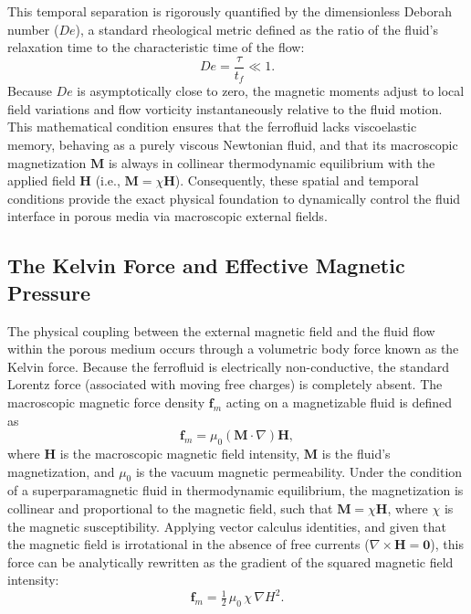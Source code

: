 This temporal separation is rigorously quantified by the dimensionless Deborah number ($De$), a standard rheological metric defined as the ratio of the fluid's relaxation time to the characteristic time of the flow:
\begin{equation}
    De = \frac{\tau}{t_f} \ll 1.
\end{equation}
Because $De$ is asymptotically close to zero, the magnetic moments adjust to local field variations and flow vorticity instantaneously relative to the fluid motion.
This mathematical condition ensures that the ferrofluid lacks viscoelastic memory, behaving as a purely viscous Newtonian fluid, and that its macroscopic magnetization $\mathbf{M}$ is always in collinear thermodynamic equilibrium with the applied field $\mathbf{H}$ (i.e., $\mathbf{M} = \chi \mathbf{H}$).
Consequently, these spatial and temporal conditions provide the exact physical foundation to dynamically control the fluid interface in porous media via macroscopic external fields.

\subsection{The Kelvin Force and Effective Magnetic Pressure}

The physical coupling between the external magnetic field and the fluid flow within the porous medium occurs through a volumetric body force known as the Kelvin force.
Because the ferrofluid is electrically non-conductive, the standard Lorentz force (associated with moving free charges) is completely absent.
The macroscopic magnetic force density $\mathbf{f}_m$ acting on a magnetizable fluid is defined as
\begin{equation}
    \mathbf{f}_m = \mu_0 (\mathbf{M} \cdot \nabla)\mathbf{H},
\end{equation}
where $\mathbf{H}$ is the macroscopic magnetic field intensity, $\mathbf{M}$ is the fluid's magnetization, and $\mu_0$ is the vacuum magnetic permeability.
Under the condition of a superparamagnetic fluid in thermodynamic equilibrium, the magnetization is collinear and proportional to the magnetic field, such that $\mathbf{M} = \chi \mathbf{H}$, where $\chi$ is the magnetic susceptibility.
Applying vector calculus identities, and given that the magnetic field is irrotational in the absence of free currents ($\nabla \times \mathbf{H} = \mathbf{0}$), this force can be analytically rewritten as the gradient of the squared magnetic field intensity:
\begin{equation}
\label{eq:kelvin-uniform-chi}
    \mathbf{f}_m = \tfrac{1}{2}\, \mu_0\, \chi\, \nabla H^2.
\end{equation}

